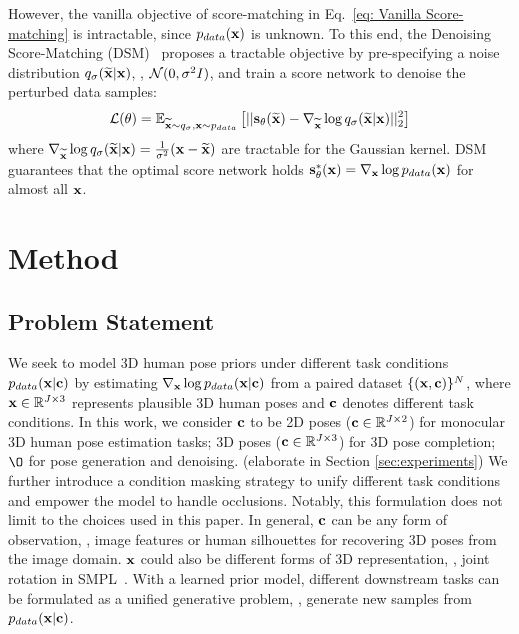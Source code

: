 \documentclass[10pt,twocolumn,letterpaper]{article}
\begin{document}
However, the vanilla objective of score-matching in Eq.~\ref{eq: Vanilla Score-matching} is intractable, since $p_{data}(\mathbf{x})$ is unknown. To this end, the Denoising Score-Matching (DSM)~\cite{denosingScoreMatching} proposes a tractable objective by pre-specifying a noise distribution $q_{\sigma}(\widetilde {\mathbf{x}}|\mathbf{x})$, \eg, $\mathcal{N}(0, \sigma^2I)$, and train a score network to denoise the perturbed data samples:
\begin{equation}
    \mathcal{L}(\theta) = \mathbb{E}_{\widetilde {\mathbf{x}} \sim q_{\sigma}, \mathbf{x} \sim p_{data}}\left[||\mathbf{s}_{\theta}(\widetilde {\mathbf{x}}) - \nabla_{\widetilde {\mathbf{x}}}\log q_{\sigma}(\widetilde {\mathbf{x}}|\mathbf{x}) ||^2_2\right]
\label{eq: DSM-Gaussian}
\end{equation}
where $\nabla_{\widetilde {\mathbf{x}}}\log q_{\sigma}(\widetilde {\mathbf{x}}|\mathbf{x}) = \frac{1}{\sigma^2}(\mathbf{x} - \widetilde {\mathbf{x}})$ are tractable for the Gaussian kernel. DSM guarantees that the optimal score network holds $\mathbf{s}_{\theta}^*(\mathbf{x}) = \nabla_{\mathbf{x}} \log p_{data}(\mathbf{x})$ for almost all $\mathbf{x}$.







 

\section{Method}
\label{sec:method}
\subsection{Problem Statement}
\label{sec:problem statement}

We seek to model 3D human pose priors under different task conditions $p_{data}(\mathbf{x}| \mathbf{c})$ by estimating $\nabla_{\mathbf{x}}\log p_{data}(\mathbf{x} | \mathbf{c} )$ from a paired dataset $\{ (\mathbf{x}, \mathbf{c})\}^N$, where $\mathbf{x} \in \mathbb{R}^{J \times 3}$ represents plausible 3D human poses and $\mathbf{c}$ denotes different task conditions. In this work, we consider $\mathbf{c}$ to be 2D poses ($\mathbf{c} \in \mathbb{R}^{J \times 2}$) for monocular 3D human pose estimation tasks; 3D poses ($\mathbf{c} \in \mathbb{R}^{J \times 3}$) for 3D pose completion; $\O$ for pose generation and denoising. (elaborate in Section \ref{sec:experiments}) We further introduce a condition masking strategy to unify different task conditions and empower the model to handle occlusions.
Notably, this formulation does not limit to the choices used in this paper. In general, $\mathbf{c}$ can be any form of observation, \eg, image features or human silhouettes for recovering 3D poses from the image domain. $\mathbf{x}$ could also be different forms of 3D representation, \eg, joint rotation in SMPL~\cite{loper2015smpl}. With a learned prior model, different downstream tasks can be formulated as a unified generative problem, \ie, generate new samples from $p_{data}(\mathbf{x}| \mathbf{c})$.
\end{document}
